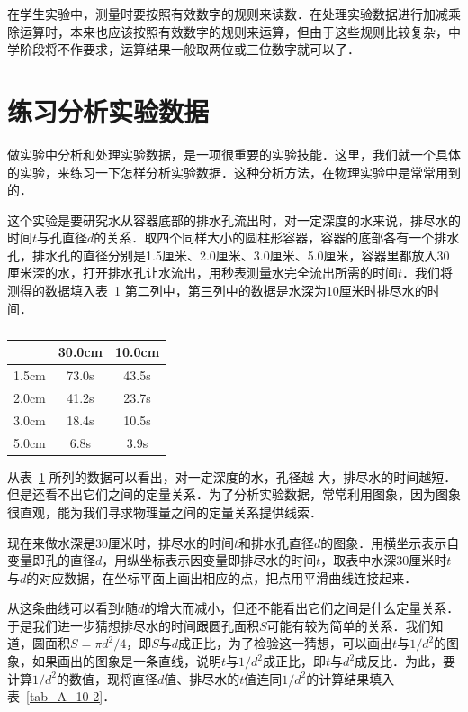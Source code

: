 在学生实验中，测量时要按照有效数字的规则来读数．在处理实验数据进行加减乘除运算时，本来也应该按照有效数字的规则来运算，但由于这些规则比较复杂，中学阶段将不作要求，运算结果一般取两位或三位数字就可以了．

\section{练习分析实验数据}
做实验中分析和处理实验数据，是一项很重要的实验技能．这里，我们就一个具体的实验，来练习一下怎样分析实验数据．这种分析方法，在物理实验中是常常用到的．

这个实验是要研究水从容器底部的排水孔流出时，对一定深度的水来说，排尽水的时间$t$与孔直径$d$的关系．取四个同样大小的圆柱形容器，容器的底部各有一个排水孔，排水孔的直径分别是1.5厘米、2.0厘米、3.0厘米、5.0厘米，容器里都放入30厘米深的水，打开排水孔让水流出，用秒表测量水完全流出所需的时间$t$．我们将测得的数据填入表~\ref{tab_A_10-1} 第二列中，第三列中的数据是水深为10厘米时排尽水的时间．

\begin{table}[htbp]
    \centering
    \begin{tabular}{ccc}
        \toprule
        &  30.0cm &  10.0cm\\
        \midrule
        1.5cm &  73.0s & 43.5s \\
        2.0cm &  41.2s & 23.7s \\
        3.0cm &  18.4s & 10.5s \\
        5.0cm &  6.8s &  3.9s\\
        \bottomrule
    \end{tabular}
    \caption{}\label{tab_A_10-1}
\end{table}

从表~\ref{tab_A_10-1} 所列的数据可以看出，对一定深度的水，孔径越
大，排尽水的时间越短．但是还看不出它们之间的定量关系．为了分析实验数据，常常利用图象，因为图象很直观，能为我们寻求物理量之间的定量关系提供线索．

现在来做水深是30厘米时，排尽水的时间$t$和排水孔直径$d$的图象．用横坐示表示自变量即孔的直径$d$，用纵坐标表示因变量即排尽水的时间$t$，取表中水深30厘米时$t$与$d$的对应数据，在坐标平面上画出相应的点，把点用平滑曲线连接起来．

从这条曲线可以看到$t$随$d$的增大而减小，但还不能看出它们之间是什么定量关系．于是我们进一步猜想排尽水的时间跟圆孔面积$S$可能有较为简单的关系．我们知道，圆面积$S=\pi d^2/4$，即$S$与$d$成正比，为了检验这一猜想，可以画出$t$与$1/d^2$的图象，如果画出的图象是一条直线，说明$t$与$1/d^2$成正比，即$t$与$d^2$成反比．为此，要计算$1/d^2$的数值，现将直径$d$值、排尽水的$t$值连同$1/d^2$的计算结果填入表~\ref{tab_A_10-2}．

